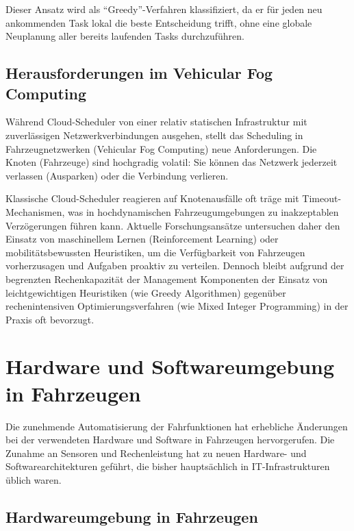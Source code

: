 Dieser Ansatz wird als \enquote{Greedy}-Verfahren klassifiziert, da er für jeden neu ankommenden Task lokal die beste Entscheidung trifft, ohne eine globale Neuplanung aller bereits laufenden Tasks durchzuführen.

\subsection{Herausforderungen im Vehicular Fog Computing}
Während Cloud-Scheduler von einer relativ statischen Infrastruktur mit zuverlässigen Netzwerkverbindungen ausgehen, stellt das Scheduling in Fahrzeugnetzwerken (Vehicular Fog Computing) neue Anforderungen. Die Knoten (Fahrzeuge) sind hochgradig volatil: Sie können das Netzwerk jederzeit verlassen (Ausparken) oder die Verbindung verlieren.

Klassische Cloud-Scheduler reagieren auf Knotenausfälle oft träge mit Timeout-Mechanismen, was in hochdynamischen Fahrzeugumgebungen zu inakzeptablen Verzögerungen führen kann. Aktuelle Forschungsansätze untersuchen daher den Einsatz von maschinellem Lernen (Reinforcement Learning) oder mobilitätsbewussten Heuristiken, um die Verfügbarkeit von Fahrzeugen vorherzusagen und Aufgaben proaktiv zu verteilen. \cite{Liu2019, Zhao2020} Dennoch bleibt aufgrund der begrenzten Rechenkapazität der Management Komponenten der Einsatz von leichtgewichtigen Heuristiken (wie Greedy Algorithmen) gegenüber rechenintensiven Optimierungsverfahren (wie Mixed Integer Programming) in der Praxis oft bevorzugt.

\section{Hardware und Softwareumgebung in Fahrzeugen}

Die zunehmende Automatisierung der Fahrfunktionen hat erhebliche Änderungen bei der verwendeten Hardware und Software in Fahrzeugen hervorgerufen. Die Zunahme an Sensoren und Rechenleistung hat zu neuen Hardware- und Softwarearchitekturen geführt, die bisher hauptsächlich in IT-Infrastrukturen üblich waren. 

\subsection{Hardwareumgebung in Fahrzeugen}
\label{Hardwareumgebung in Fahrzeugen}

